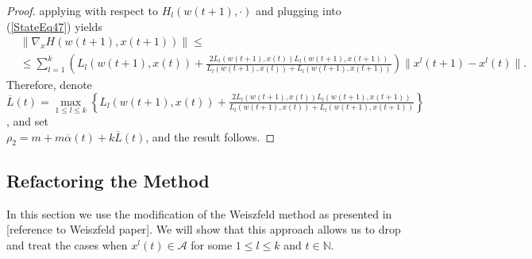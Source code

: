 \documentclass[11pt]{article}
\numberwithin{equation}{section}
\begin{document}
\begin{proof}
applying  with respect to $H_l(w(t+1),\cdot)$ and plugging into (\ref{StateEq47}) yields
\begin{equation*}
\begin{aligned}
	&\| \nabla_x H(w(t+1),x(t+1)) \| \leq \\
	&\leq \sum\limits_{l=1}^{k} \left( L_l(w(t+1),x(t)) + \frac{2 L_l(w(t+1),x(t)) L_l(w(t+1),x(t+1))}{L_l(w(t+1),x(t)) + L_l(w(t+1),x(t+1))} \right) \|x^l(t+1) - x^l(t)\| .
\end{aligned}
\end{equation*}
Therefore, denote $\overline{L}(t) = \max\limits_{1 \leq l \leq k} \left\lbrace L_l(w(t+1),x(t)) + \frac{2 L_l(w(t+1),x(t)) L_l(w(t+1),x(t+1))}{L_l(w(t+1),x(t)) + L_l(w(t+1),x(t+1))} \right\rbrace$, and set \\ $\rho_2 = m + m\overline{\alpha}(t) + k\overline{L}(t)$, and the result follows.
\end{proof}

\subsection{Refactoring the Method}
In this section we use the modification of the Weiszfeld method as presented in [reference to Weiszfeld paper]. We will show that this approach allows us to drop  and treat the cases when $x^l(t) \in \mathcal{A}$ for some $1 \leq l \leq k$ and $t \in \mathbb{N}$.
\end{document}
